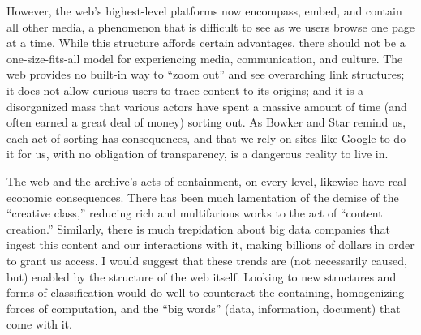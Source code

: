 However, the web's highest-level platforms now encompass, embed, and contain all other media, a phenomenon that is difficult to see as we users browse one page at a time. While this structure affords certain advantages, there should not be a one-size-fits-all model for experiencing media, communication, and culture. The web provides no built-in way to ``zoom out'' and see overarching link structures; it does not allow curious users to trace content to its origins; and it is a disorganized mass that various actors have spent a massive amount of time (and often earned a great deal of money) sorting out. As Bowker and Star remind us, each act of sorting has consequences, and that we rely on sites like Google to do it for us, with no obligation of transparency, is a dangerous reality to live in.

The web and the archive's acts of containment, on every level, likewise have real economic consequences. There has been much lamentation of the demise of the ``creative class,'' reducing rich and multifarious works to the act of ``content creation.'' Similarly, there is much trepidation about big data companies that ingest this content and our interactions with it, making billions of dollars in order to grant us access. I would suggest that these trends are (not necessarily caused, but) enabled by the structure of the web itself. Looking to new structures and forms of classification would do well to counteract the containing, homogenizing forces of computation, and the ``big words'' (data, information, document) that come with it.





